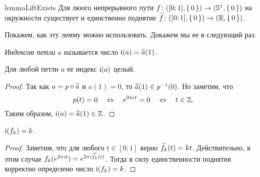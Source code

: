 \documentclass[main]{subfiles}
\begin{document}
\begin{restatable}{lemma}{LiftExists}
	Для люого непрерывного пути $ f \colon ([0; 1], \left\{\,0\,\right\}) \to (\mathbb{S}^1, \left\{\,0\,\right\}) $ на окружности существует и
	единственно поднятие $ \widetilde{f} \colon ([0; 1], \left\{\,0\,\right\}) \to (\mathbb{R}, \left\{\,0\,\right\}) $.
\end{restatable}

Покажем, как эту лемму можно использовать. Докажем мы ее в следующий раз.

\begin{definition}
	\emph{Индексом петли} $ a $ называется число $ \operatorname{i}(a) = \widetilde{a}(1) $.
\end{definition}

\begin{statement}
	Для любой петли $ a $ ее индекс $ \operatorname{i}(a) $ целый.
\end{statement}

\begin{proof}
	Так как $ a = p \circ \widetilde{a} $ и $ a(1) = 0 $, то $ \widetilde{a}(1) \in p^{-1}(0) $. Но заметим, что
		\[ p(t) = 0 \quad \Leftrightarrow \quad e^{2 \pi i t} = 0 \quad \Leftrightarrow \quad t \in \mathbb{Z}. \]
	Таким образом, $ \operatorname{i}(a) = \widetilde{a}(1) \in \mathbb{Z} $.
\end{proof}

\begin{statement}
	$ \operatorname{i}(f_k) = k $.
\end{statement}

\begin{proof}
	Заметим, что для любого $ t \in [0; 1] $ верно $ \widetilde{f_k}(t) = k t $. Действительно, в этом случае
	$ f_k(e^{2 \pi i t}) = e^{2 \pi i \widetilde{f_k}(t)} $. Тогда в силу единственности поднятия корректно определено число
	$ \operatorname{i}(f_k) = k $.
\end{proof}
\end{document}
